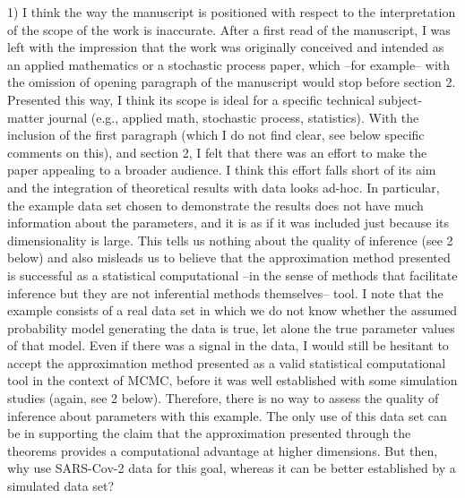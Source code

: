 \documentclass[12pt]{article}
\begin{document}
1) I think the way the manuscript is positioned with respect to the interpretation of the scope of the work is inaccurate. After a first read of the manuscript, I was left with the impression that the work was originally conceived and intended as an applied mathematics or a stochastic process paper, which --for example-- with the omission of opening paragraph of the manuscript would stop before section 2. Presented this way, I think its scope is ideal for a specific technical subject-matter journal (e.g., applied math, stochastic process, statistics). With the inclusion of the first paragraph (which I do not find clear, see below specific comments on this), and section 2, I felt that there was an effort to make the paper appealing to a broader audience. I think this effort falls short of its aim and the integration of theoretical results with data looks ad-hoc. In particular, the example data set chosen to demonstrate the results does not have much information about the parameters, and it is as if it was included just because its dimensionality is large. This tells us nothing about the quality of inference (see 2 below) and also misleads us to believe that the approximation method presented is successful as a statistical computational --in the sense of methods that facilitate inference but they are not inferential methods themselves-- tool. I note that the example consists of a real data set in which we do not know whether the assumed probability model generating the data is true, let alone the true parameter values of that model. Even if there was a signal in the data, I would still be hesitant to accept the approximation method presented as a valid statistical computational tool in the context of MCMC, before it was well established with some simulation studies (again, see 2 below). Therefore, there is no way to assess the quality of inference about parameters with this example. The only use of this data set can be in supporting the claim that the approximation presented through the theorems provides a computational advantage at higher dimensions. But then, why use SARS-Cov-2 data for this goal, whereas it can be better established by a simulated data set? 
\end{document}
